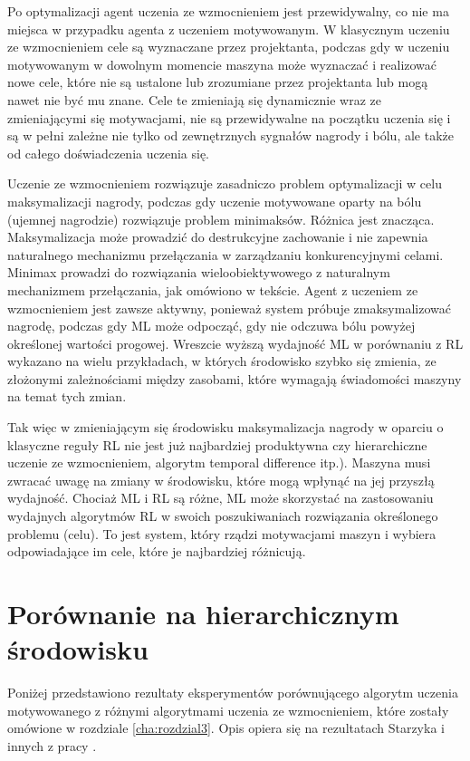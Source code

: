 Po optymalizacji agent uczenia ze wzmocnieniem jest przewidywalny, co nie ma 
miejsca w przypadku agenta z uczeniem motywowanym. 
W klasycznym uczeniu ze wzmocnieniem cele są wyznaczane przez projektanta, 
podczas gdy w uczeniu motywowanym w dowolnym momencie maszyna może wyznaczać i 
realizować nowe cele, które nie są ustalone lub zrozumiane przez projektanta 
lub mogą nawet nie być mu znane. Cele te zmieniają się dynamicznie wraz ze 
zmieniającymi się motywacjami, nie są przewidywalne na początku uczenia się i 
są w pełni zależne nie tylko od zewnętrznych sygnałów nagrody i bólu, ale także 
od całego doświadczenia uczenia się.

Uczenie ze wzmocnieniem rozwiązuje zasadniczo problem optymalizacji w celu 
maksymalizacji nagrody, podczas gdy uczenie motywowane oparty na bólu (ujemnej 
nagrodzie) 
rozwiązuje problem minimaksów. Różnica jest znacząca. Maksymalizacja może 
prowadzić do destrukcyjne zachowanie i nie zapewnia naturalnego mechanizmu 
przełączania w zarządzaniu konkurencyjnymi celami. Minimax prowadzi do 
rozwiązania wieloobiektywowego z naturalnym mechanizmem przełączania, jak 
omówiono w tekście. Agent z uczeniem ze wzmocnieniem jest zawsze aktywny, 
ponieważ system próbuje zmaksymalizować nagrodę, podczas gdy ML może odpocząć, 
gdy nie odczuwa bólu powyżej określonej wartości progowej. Wreszcie wyższą 
wydajność ML w porównaniu z RL wykazano na wielu przykładach, w których 
środowisko szybko się zmienia, ze złożonymi zależnościami między zasobami, 
które wymagają świadomości maszyny na temat tych zmian.

Tak więc w zmieniającym się środowisku maksymalizacja nagrody w oparciu o 
klasyczne reguły RL nie jest już najbardziej produktywna czy hierarchiczne 
uczenie ze wzmocnieniem, algorytm temporal difference itp.). Maszyna musi 
zwracać uwagę na zmiany w środowisku, które mogą wpłynąć na jej przyszłą 
wydajność. Chociaż ML i RL są różne, ML może skorzystać na zastosowaniu 
wydajnych algorytmów RL w swoich poszukiwaniach rozwiązania określonego 
problemu (celu). To jest system, który rządzi motywacjami maszyn i wybiera 
odpowiadające im cele, które je najbardziej różnicują.

\section{Porównanie na hierarchicznym środowisku}

Poniżej przedstawiono rezultaty eksperymentów porównującego algorytm uczenia 
motywowanego z różnymi algorytmami uczenia ze wzmocnieniem, które zostały 
omówione w rozdziale \ref{cha:rozdzial3}. Opis opiera się na rezultatach 
Starzyka i innych z pracy \cite{ml_vs_rl_comparative_study}.

